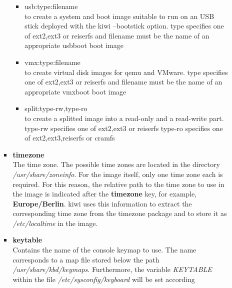 \begin{itemize}
\begin{enumerate}
\begin{itemize}
\begin{itemize}
                        \item usb:type:filename\\
                              to create a system and boot image suitable
                              to run on an USB stick deployed with the kiwi
                              --bootstick option. type specifies one of 
                              ext2,ext3 or reiserfs and filename must be
                              the name of an appropriate usbboot boot image  
                        \item vmx:type:filename\\
                              to create virtual disk images for qemu and
                              VMware. type specifies one of ext2,ext3 or
                              reiserfs and filename must be the name of an
                              appropriate vmxboot boot image
                        \item split:type-rw,type-ro\\
                              to create a splitted image into a read-only
                              and a read-write part. type-rw specifies one of
                              ext2,ext3 or reiserfs type-ro specifies one
                              of ext2,ext3,reiserfs or cramfs
					\end{itemize}
              \item \textbf{timezone}\\
                    The time zone. The possible time zones are located in the
                    directory \textit{/usr/share/zoneinfo}. For the image
                    itself, only one time zone each is required. For this
                    reason, the relative path to the time zone to use in the
                    image is indicated after the \textbf{timezone} key, for
                    example, \textbf{Europe/Berlin}. kiwi uses this information
                    to extract the corresponding time zone from the timezone
                    package and to store it as \textit{/etc/localtime} in the
                    image.
              \item \textbf{keytable}\\
                    Contains the name of the console keymap to use. The name
                    corresponds to a map file stored below the path
                    \textit{/usr/share/kbd/keymaps}. Furthermore, the variable
                    \textit{KEYTABLE} within the file
                    \textit{/etc/sysconfig/keyboard} will be set according

\end{itemize}
\end{enumerate}
\end{itemize}
